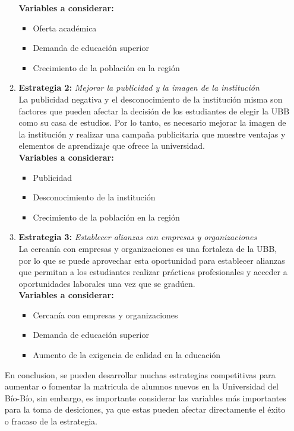 \documentclass{templateNote}
\begin{document}
\begin{enumerate}
\begin{enumerate}
        \textbf{Variables a considerar:} 
        \begin{itemize}
            \item Oferta académica
            \item Demanda de educación superior
            \item Crecimiento de la población en la región
        \end{itemize}
        \item \textbf{Estrategia 2:} \textit{Mejorar la publicidad y la imagen de la institución} \\
        \noindent La publicidad negativa y el desconocimiento de la institución misma son factores que pueden afectar la decisión de los estudiantes de elegir la UBB como su casa de estudios. Por lo tanto, es necesario mejorar la imagen de la institución y realizar una campaña publicitaria que muestre ventajas y elementos de aprendizaje que ofrece la universidad.\\
        \textbf{Variables a considerar:} 
        \begin{itemize}
            \item Publicidad
            \item Desconocimiento de la institución
            \item Crecimiento de la población en la región
        \end{itemize}
        \item \textbf{Estrategia 3:} \textit{Establecer alianzas con empresas y organizaciones} \\
        \noindent La cercanía con empresas y organizaciones es una fortaleza de la UBB, por lo que se puede aprovechar esta oportunidad para establecer alianzas que permitan a los estudiantes realizar prácticas profesionales y acceder a oportunidades laborales una vez que se gradúen.\\
        \textbf{Variables a considerar:} 
        \begin{itemize}
            \item Cercanía con empresas y organizaciones
            \item Demanda de educación superior
            \item Aumento de la exigencia de calidad en la educación
        \end{itemize}
    \end{enumerate}

    En conclusion, se pueden desarrollar muchas estrategias competitivas para aumentar o fomentar la matricula de alumnos nuevos en la Universidad del Bío-Bío, sin embargo, es importante considerar las variables más importantes para la toma de desiciones, ya que estas pueden afectar directamente el éxito o fracaso de la estrategia.\\
\end{enumerate}
\end{document}
